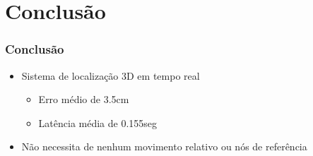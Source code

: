 \section{Conclusão}

\begin{frame}
  \frametitle{Conclusão}

		\begin{itemize}
    \item Sistema de localização 3D em tempo real
				\begin{itemize}
      \item Erro médio de 3.5cm
						\item Latência média de 0.155seg
				\end{itemize}
				\item Não necessita de nenhum movimento relativo ou nós de referência
		\end{itemize}
\end{frame}
